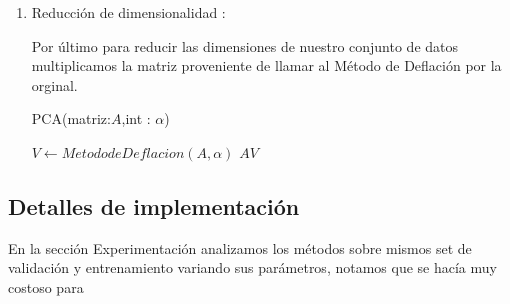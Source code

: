 \begin{enumerate}
\item Reducción de dimensionalidad :

Por último para reducir las dimensiones de nuestro conjunto de datos multiplicamos la matriz proveniente de llamar al Método de Deflación por la orginal.
\begin{algorithm}[H]
\caption{PCA(matriz:$A$,int : $\alpha$)}
\begin{algorithmic}[H]
    \State $V  \leftarrow Metodo de Deflacion(A,\alpha)$
    \State
    \Return  $A V$
\end{algorithmic}
\end{algorithm}

\end{enumerate}





\subsection{Detalles de implementación }

En la sección Experimentación analizamos los métodos sobre mismos set de validación y entrenamiento variando sus parámetros, notamos que se hacía muy costoso para 










